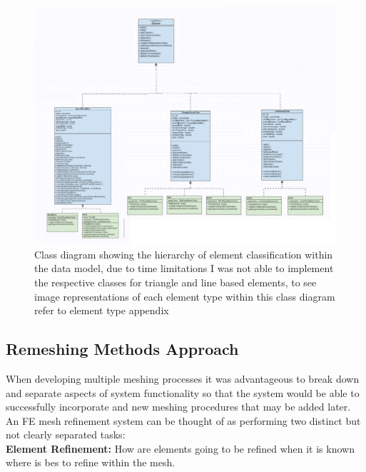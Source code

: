 \begin{landscape}

\begin{figure}[h!!]                                                   
  \centerline{\includegraphics[width=180mm, scale=1]{../Graphics/ElementHigerarchyDiagram2.png}}
  \caption{Class diagram showing the hierarchy of element classification within the data model, due to time limitations I was not able to implement the respective classes for triangle and line based elements, to see image representations of each element type within this class diagram refer to element type appendix}
  \label{fig:h-refinementImp}
\end{figure}
\end{landscape}


\subsection{Remeshing Methods Approach}
When developing multiple meshing processes it was advantageous to break down and separate aspects of system functionality so that the system would be able to successfully incorporate and new meshing procedures that may be added later. An FE mesh refinement system can be thought of as performing two distinct but not clearly separated tasks: \\ 

\noindent
\textbf{Element Refinement: } How are elements going to be refined when it is known where is bes to refine within the mesh. \\

